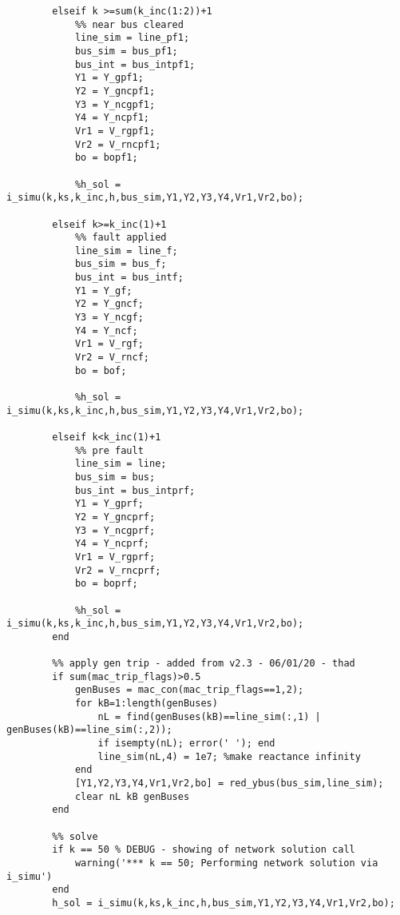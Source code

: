 \documentclass[12pt]{article}
\begin{document}
\begin{verbatim}
        elseif k >=sum(k_inc(1:2))+1
            %% near bus cleared
            line_sim = line_pf1;
            bus_sim = bus_pf1;
            bus_int = bus_intpf1;
            Y1 = Y_gpf1;
            Y2 = Y_gncpf1;
            Y3 = Y_ncgpf1;
            Y4 = Y_ncpf1;
            Vr1 = V_rgpf1;
            Vr2 = V_rncpf1;
            bo = bopf1;
            
            %h_sol = i_simu(k,ks,k_inc,h,bus_sim,Y1,Y2,Y3,Y4,Vr1,Vr2,bo);
            
        elseif k>=k_inc(1)+1
            %% fault applied
            line_sim = line_f;
            bus_sim = bus_f;
            bus_int = bus_intf;
            Y1 = Y_gf;
            Y2 = Y_gncf;
            Y3 = Y_ncgf;
            Y4 = Y_ncf;
            Vr1 = V_rgf;
            Vr2 = V_rncf;
            bo = bof;
            
            %h_sol = i_simu(k,ks,k_inc,h,bus_sim,Y1,Y2,Y3,Y4,Vr1,Vr2,bo);
            
        elseif k<k_inc(1)+1
            %% pre fault
            line_sim = line;
            bus_sim = bus;
            bus_int = bus_intprf;
            Y1 = Y_gprf;
            Y2 = Y_gncprf;
            Y3 = Y_ncgprf;
            Y4 = Y_ncprf;
            Vr1 = V_rgprf;
            Vr2 = V_rncprf;
            bo = boprf;
            
            %h_sol = i_simu(k,ks,k_inc,h,bus_sim,Y1,Y2,Y3,Y4,Vr1,Vr2,bo);
        end
        
        %% apply gen trip - added from v2.3 - 06/01/20 - thad
        if sum(mac_trip_flags)>0.5
            genBuses = mac_con(mac_trip_flags==1,2);
            for kB=1:length(genBuses)
                nL = find(genBuses(kB)==line_sim(:,1) | genBuses(kB)==line_sim(:,2));
                if isempty(nL); error(' '); end
                line_sim(nL,4) = 1e7; %make reactance infinity
            end
            [Y1,Y2,Y3,Y4,Vr1,Vr2,bo] = red_ybus(bus_sim,line_sim);
            clear nL kB genBuses
        end
        
        %% solve
        if k == 50 % DEBUG - showing of network solution call
            warning('*** k == 50; Performing network solution via i_simu')
        end
        h_sol = i_simu(k,ks,k_inc,h,bus_sim,Y1,Y2,Y3,Y4,Vr1,Vr2,bo);
        

\end{verbatim}
\end{document}
